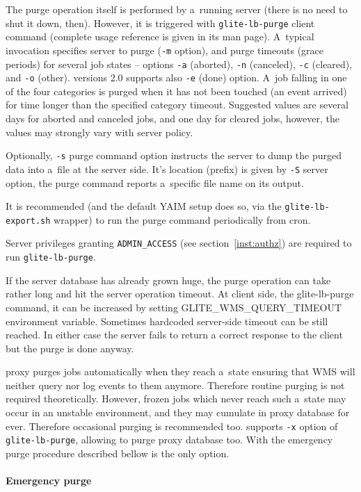 The purge operation itself is performed by a~running \LB server
(there is no need to shut it down, then).
However, it is triggered with \verb'glite-lb-purge' client command
(complete usage reference is given in its man page).
A~typical invocation specifies \LB server to purge (\verb'-m' option),
and purge timeouts (grace periods) for several job states -- options
\verb'-a' (aborted), \verb'-n' (canceled), \verb'-c' (cleared), and
\verb'-o' (other). \LB versions 2.0 supports also \verb'-e' (done) option.
A~job falling in one of the four categories is purged when it has not been
touched (\ie an event arrived) for time longer than the specified category
timeout.
Suggested values are several days for aborted and canceled jobs,
and one day for cleared jobs, however, the values may strongly vary
with \LB server policy.

Optionally, \verb'-s' purge command option instructs the server to
dump the purged data into a~file at the server side.
It's location (prefix) is given by \verb'-S' server option,
the purge command reports a~specific file name on its output.

It is recommended (and the default YAIM setup does so, via
the \verb'glite-lb-export.sh' wrapper) to run the purge
command periodically from cron.

Server privileges granting \verb'ADMIN_ACCESS' (see section~\ref{inst:authz}) are required to run \verb'glite-lb-purge'.

If the server database has already grown huge, the purge operation can take
rather long and hit the \LB server operation timeout. At client side, \ie the
glite-lb-purge command, it can be increased by setting GLITE\_WMS\_QUERY\_TIMEOUT
environment variable.
Sometimes hardcoded server-side timeout can be still reached. In either case the
server fails to return a correct response to the client but the purge is done anyway. 

\LB proxy purges jobs automatically when they reach a~state ensuring that WMS will
neither query nor log events to them anymore.
Therefore routine purging is not required theoretically.
However, frozen jobs which never reach such a~state may occur in an unstable environment,
and they may cumulate in \LB proxy database for ever.
Therefore occasional purging is recommended too.
 supports \verb'-x' option of \verb'glite-lb-purge', allowing
to purge \LB proxy database too.
With  the emergency purge procedure described bellow is the only option.

\paragraph{Emergency purge}


